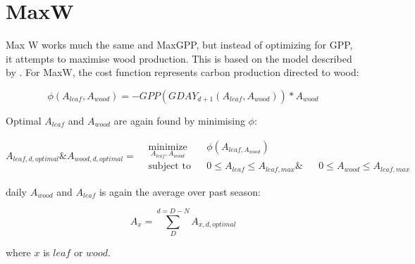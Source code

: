 \section{MaxW}
Max W works much the same and MaxGPP, but instead of optimizing for GPP, it attempts to maximise wood production. This is  based on the model described by  \citep{McMurtrie2013}. For MaxW, the cost function represents carbon production directed to wood:

\begin{equation}
	\phi(A_{leaf},A_{wood}) = - GPP (GDAY_{d+1}(A_{leaf},A_{wood})) * A_{wood}
\end{equation}

Optimal $A_{leaf}$ and $A_{wood}$ are again found by minimising $\phi$:

\begin{equation*}
A_{leaf,d,optimal} \text{\&} A_{wood,d,optimal}=
\begin{aligned}
& \underset{A_{leaf}, A_{wood}}{\text{minimize}}
& & \phi(A_{leaf,A_{wood}}) \\
& \text{subject to}
& & 0 \leq A_{leaf} \leq A_{leaf,max} \&
& & 0 \leq A_{wood} \leq A_{leaf,max}
\end{aligned}
\end{equation*}

 daily $A_{wood}$ and $A_{leaf}$ is again the average over past season:

\begin{equation}
	A_{x}= \sum_{D}^{d=D-N} A_{x,d,optimal}
\end{equation}

where $x$ is $leaf$ or $wood$.
